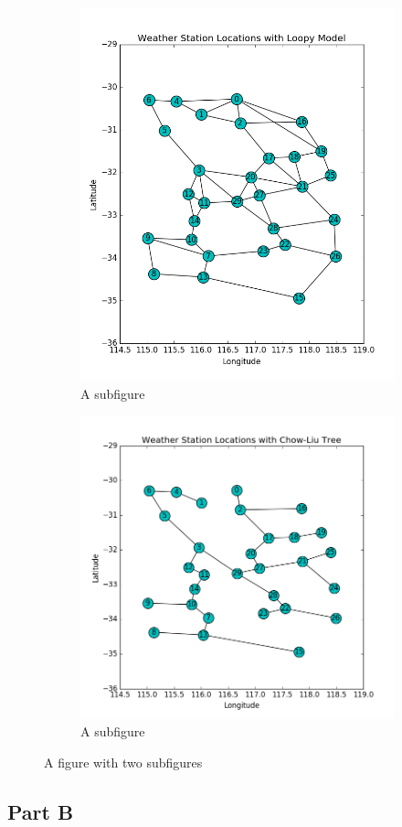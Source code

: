 \documentclass[twoside,11pt]{article}
\theoremstyle{definition}
\begin{document}
\begin{figure}[h]
\centering
\begin{subfigure}{.5\textwidth}
  \centering
  \includegraphics[width=3 in]{loopyModelFigure2.png}
  \caption{A subfigure}
\end{subfigure}%
\begin{subfigure}{.5\textwidth}
  \centering
  \includegraphics[width=3 in]{chowLiuTreeFigure2.png}
  \caption{A subfigure}
\end{subfigure}
\caption{A figure with two subfigures}
\end{figure}

\newpage

\subsection*{Part B}
\end{document}
